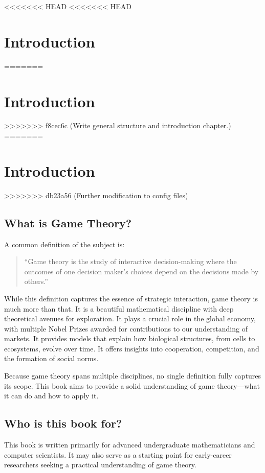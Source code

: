 <<<<<<< HEAD
<<<<<<< HEAD
\chapter{Introduction}\label{chapter:introduction}
=======
\chapter{Introduction}
\label{chapter:introduction}
>>>>>>> f8cec6c (Write general structure and introduction chapter.)
=======
\chapter{Introduction}\label{chapter:introduction}
>>>>>>> db23a56 (Further modification to config files)

\section{What is Game Theory?}

A common definition of the subject is:

\begin{quote} 
``Game theory is the study of interactive decision-making where
the outcomes of one decision maker’s choices depend on the decisions made by
others.'' 
\end{quote}

While this definition captures the essence of strategic interaction, game theory
is much more than that. It is a beautiful mathematical discipline with deep
theoretical avenues for exploration. It plays a crucial role in the global
economy, with multiple Nobel Prizes awarded for contributions to our
understanding of markets. It provides models that explain how biological
structures, from cells to ecosystems, evolve over time. It offers insights into
cooperation, competition, and the formation of social norms.

Because game theory spans multiple disciplines, no single definition fully
captures its scope. This book aims to provide a solid understanding of game
theory—what it can do and how to apply it.

\section{Who is this book for?}

This book is written primarily for advanced undergraduate mathematicians and
computer scientists. It may also serve as a starting point for early-career
researchers seeking a practical understanding of game theory.  

